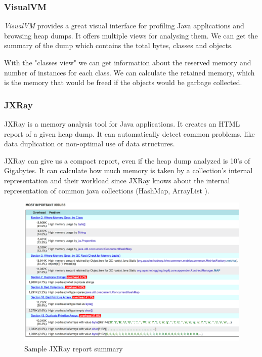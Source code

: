 \subsubsection{VisualVM}
\textit{VisualVM} provides a great visual interface for profiling Java applications and browsing heap dumps. It offers multiple views for analysing them. We can get the summary of the dump which contains the total bytes, classes and objects. 

With the "classes view" we can get information about the reserved memory and number of instances for each class. We can calculate the retained memory, which is the memory that would be freed if the objects would be garbage collected.

\subsubsection{JXRay}
JXRay \cite{jxray} is a memory analysis tool for Java applications. It creates an HTML report of a given heap dump. It can automatically detect common problems, like data duplication or non-optimal use of data structures. 

JXRay can give us a compact report, even if the heap dump analyzed is 10's of Gigabytes. It can calculate how much memory is taken by a collection's internal representation and their workload since JXRay knows about the internal representation of common java collections (HashMap, ArrayList \etc).

\begin{figure}[H]
	\includegraphics[width=150mm, keepaspectratio]{figures/jxray_sample.png}
	\centering
	\caption{Sample JXRay report summary}
\end{figure}

